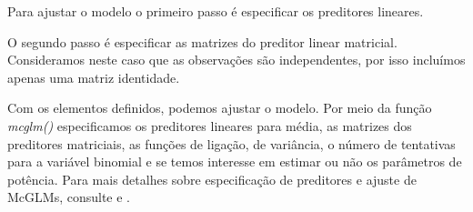 Para ajustar o modelo o primeiro passo é especificar os preditores lineares.

\begin{knitrout}
\color{fgcolor}\begin{kframe}
\begin{alltt}
 \hlkwb{<-}  \hlopt{~}  \hlopt{+}  \hlopt{*} 
 \hlkwb{<-}  \hlopt{~}  \hlopt{+}  \hlopt{*} 

\hlopt{$} \hlkwb{<-} \hlopt{$} \hlopt{/} \hlopt{$}
 \hlkwb{<-}  \hlopt{~}  \hlopt{+}  \hlopt{*} 
\end{alltt}
\end{kframe}
\end{knitrout}

O segundo passo é especificar as matrizes do preditor linear matricial. Consideramos neste caso que as observações são independentes, por isso incluímos apenas uma matriz identidade.

\begin{knitrout}
\color{fgcolor}\begin{kframe}
\begin{alltt}
 \hlkwb{<-} 
\end{alltt}
\end{kframe}
\end{knitrout}

Com os elementos definidos, podemos ajustar o modelo. Por meio da função \emph{mcglm()} especificamos os preditores lineares para média, as matrizes dos preditores matriciais, as funções de ligação, de variância, o número de tentativas para a variável binomial e se temos interesse em estimar ou não os parâmetros de potência. Para mais detalhes sobre especificação de preditores e ajuste de McGLMs, consulte \citet{Bonat16} e \citet{mcglm}.

